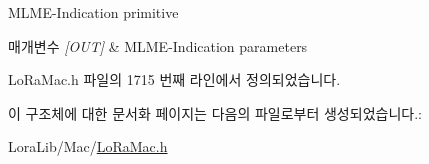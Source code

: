 M\+L\+M\+E-\/\+Indication primitive 


\begin{DoxyParams}{매개변수}
{\em \mbox{[}\+O\+U\+T\mbox{]}} & M\+L\+M\+E-\/\+Indication parameters \\
\hline
\end{DoxyParams}


Lo\+Ra\+Mac.\+h 파일의 1715 번째 라인에서 정의되었습니다.



이 구조체에 대한 문서화 페이지는 다음의 파일로부터 생성되었습니다.\+:\begin{DoxyCompactItemize}
\item 
Lora\+Lib/\+Mac/\mbox{\hyperlink{_lo_ra_mac_8h}{Lo\+Ra\+Mac.\+h}}\end{DoxyCompactItemize}
